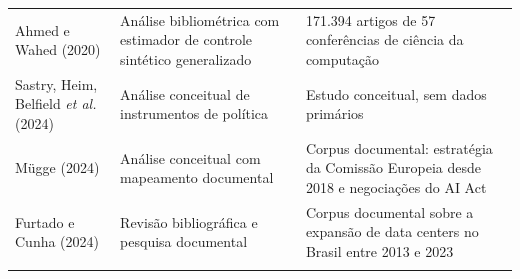 \documentclass[12pt,a4paper]{article}
\begin{document}
\begin{longtable}{@{}p{2.4cm} p{6.0cm} p{6.0cm}@{}}
\addlinespace
Ahmed e Wahed (2020) & Análise bibliométrica com estimador de controle sintético generalizado & 171.394 artigos de 57 conferências de ciência da computação \\
\addlinespace
Sastry, Heim, Belfield \emph{et al.} (2024) & Análise conceitual de instrumentos de política & Estudo conceitual, sem dados primários \\
\addlinespace
Mügge (2024) & Análise conceitual com mapeamento documental & Corpus documental: estratégia da Comissão Europeia desde 2018 e negociações do AI Act \\
\addlinespace
Furtado e Cunha (2024) & Revisão bibliográfica e pesquisa documental & Corpus documental sobre a expansão de data centers no Brasil entre 2013 e 2023 \\
\addlinespace
\end{longtable}
\end{document}
